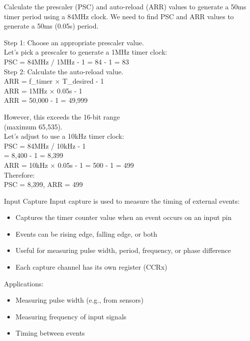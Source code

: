 \begin{example}
Calculate the prescaler (PSC) and auto-reload (ARR) values to generate a 50ms timer period using a 84MHz clock.
\tcblower
We need to find PSC and ARR values to generate a 50ms (0.05s) period.
\vspace{1mm}\\
\begin{minipage}{0.5\linewidth}
Step 1: Choose an appropriate prescaler value.\\
Let's pick a prescaler to generate a 1MHz timer clock:\\
PSC = 84MHz / 1MHz - 1 = 84 - 1 = 83
\vspace{1mm}\\
Step 2: Calculate the auto-reload value.\\
ARR = f\_{timer} × T\_{desired} - 1\\
ARR = 1MHz × 0.05s - 1\\
ARR = 50,000 - 1 = 49,999
\end{minipage}
\hspace{4mm}
\begin{minipage}{0.4\linewidth}
However, this exceeds the 16-bit range \\(maximum 65,535).\\
Let's adjust to use a 10kHz timer clock:\\
PSC = 84MHz / 10kHz - 1 \\ = 8,400 - 1 = 8,399\\
ARR = 10kHz × 0.05s - 1 = 500 - 1 = 499
\vspace{1mm}\\
Therefore:\\
PSC = 8,399,
ARR = 499
\end{minipage}
\end{example}


\begin{definition}{Input Capture}
Input capture is used to measure the timing of external events:
\begin{itemize}
    \item Captures the timer counter value when an event occurs on an input pin
    \item Events can be rising edge, falling edge, or both
    \item Useful for measuring pulse width, period, frequency, or phase difference
    \item Each capture channel has its own register (CCRx)
\end{itemize}
Applications:
\begin{itemize}
    \item Measuring pulse width (e.g., from sensors)
    \item Measuring frequency of input signals
    \item Timing between events
\end{itemize}
\end{definition}



